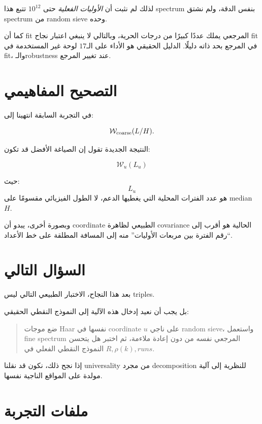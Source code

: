\documentclass[12pt]{article}
\begin{document}
لذلك لم نثبت أن \emph{الأوليات الفعلية} حتى \(10^{12}\) تتبع هذا spectrum
بنفس الدقة، ولم نشتق spectrum من random sieve وحده.

كما أن fit المرجعي يملك عددًا كبيرًا من درجات الحرية، وبالتالي لا ينبغي
اعتبار نجاح fit في المرجع بحد ذاته دليلًا. الدليل الحقيقي هو الأداء على
الـ\(17\) لوحة غير المستخدمة في fit، والـrobustness عند تغيير المرجع.

\section{التصحيح المفاهيمي}

في التجربة السابقة انتهينا إلى:

\[
\mathcal W_{\rm coarse}(L/H).
\]

النتيجة الجديدة تقول إن الصياغة الأفضل قد تكون:

\[
\boxed{
\mathcal W_u(L_u)
}
\]

حيث:
\[
L_u
\]
هو عدد الفترات المحلية التي يغطيها الدعم، لا الطول الفيزيائي مقسومًا على
median \(H\).

وبصورة أخرى، يبدو أن coordinate الطبيعي لظاهرة covariance الحالية هو أقرب إلى
``رقم الفترة بين مربعات الأوليات'' منه إلى المسافة المطلقة على خط الأعداد.

\section{السؤال التالي}

بعد هذا النجاح، الاختبار الطبيعي التالي ليس triples.

بل يجب أن نعيد إدخال هذه الآلية إلى النموذج النقطي الحقيقي:

\begin{quote}
ضع موجات Haar نفسها في coordinate \(u\) على ناجي random sieve،
واستعمل fine spectrum المرجعي نفسه من دون إعادة ملاءمة،
ثم اختبر هل يتحسن النموذج النقطي الفعلي في
\(R,\rho(k),runs\).
\end{quote}

إذا نجح ذلك، نكون قد نقلنا universality من مجرد decomposition للنظرية إلى
آلية مولدة على المواقع الناجية نفسها.

\section{ملفات التجربة}
\end{document}
